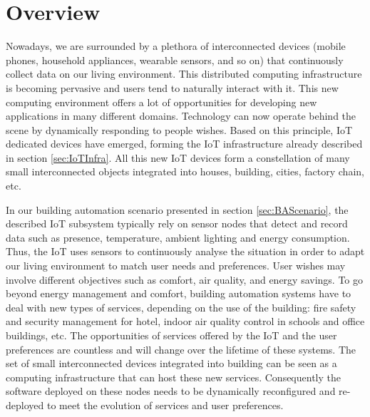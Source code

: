 \section{Overview}
Nowadays, we are surrounded by a plethora of interconnected devices (mobile phones, household appliances, wearable sensors, and so on) that continuously collect data on our living environment.
This distributed computing infrastructure is becoming pervasive and users tend to naturally interact with it. This new computing environment offers a lot of opportunities for developing new applications in many different domains.
Technology can now operate behind the scene by dynamically responding to people wishes.
Based on this principle, IoT dedicated devices have emerged, forming the IoT infrastructure already described in section \ref{sec:IoTInfra}.
All this new IoT devices form a constellation of many small interconnected objects integrated into houses, building, cities, factory chain, etc.

In our building automation scenario presented in section \ref{sec:BAScenario}, the described IoT subsystem typically rely on sensor nodes that detect and record data such as presence, temperature, ambient lighting and energy consumption. 
Thus, the IoT uses sensors to continuously analyse the situation in order to adapt our living environment to match user needs and preferences.
User wishes may involve different objectives such as comfort, air quality, and energy savings. 
To go beyond energy management and comfort, building automation systems have to deal with new types of services, depending on the use of the building: fire safety and security management for hotel, indoor air quality control in schools and office buildings, etc. 
The opportunities of services offered by the IoT and the user preferences are countless and will change over the lifetime of these systems.
The set of small interconnected devices integrated into building can be seen as a computing infrastructure that can host these new services. 
Consequently the software deployed on these nodes needs to be dynamically reconfigured and re-deployed to meet the evolution of services and user preferences. 



